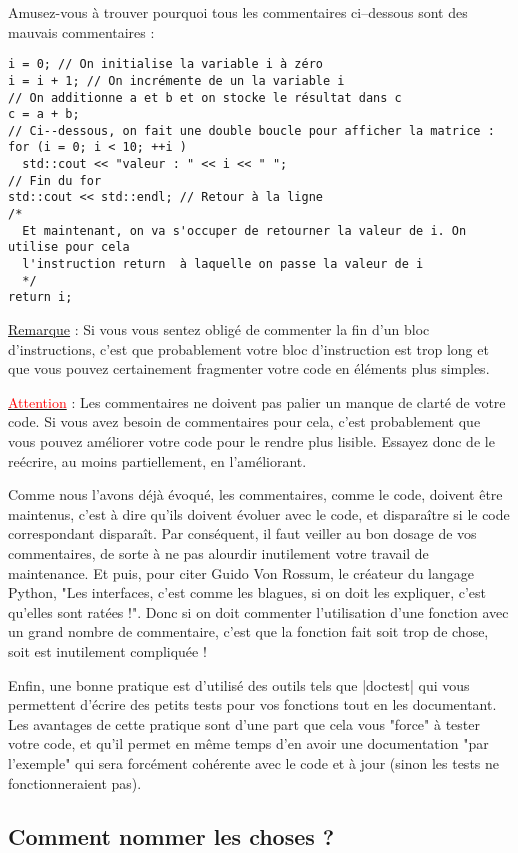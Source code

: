 Amusez-vous à trouver pourquoi tous les commentaires ci--dessous sont des mauvais commentaires :
\begin{lstlisting}
i = 0; // On initialise la variable i à zéro
i = i + 1; // On incrémente de un la variable i
// On additionne a et b et on stocke le résultat dans c
c = a + b;
// Ci--dessous, on fait une double boucle pour afficher la matrice :
for (i = 0; i < 10; ++i )
  std::cout << "valeur : " << i << " ";
// Fin du for
std::cout << std::endl; // Retour à la ligne
/*
  Et maintenant, on va s'occuper de retourner la valeur de i. On utilise pour cela
  l'instruction return  à laquelle on passe la valeur de i
  */
return i;
\end{lstlisting}

\underline{Remarque} : Si vous vous sentez obligé de commenter la fin d'un bloc d'instructions, c'est que
probablement votre bloc d'instruction est trop long et que vous pouvez certainement fragmenter votre code
en éléments plus simples.

\underline{\textcolor{red}{Attention}} : Les commentaires ne doivent pas palier un manque de clarté de votre code. Si
vous avez besoin de commentaires pour cela, c'est probablement que vous pouvez améliorer votre code pour le rendre plus
lisible. Essayez donc de le reécrire, au moins partiellement, en l'améliorant.

Comme nous l'avons déjà évoqué, les commentaires, comme le code, doivent être maintenus, c'est à dire qu'ils doivent
évoluer avec le code, et disparaître si le code correspondant disparaît. Par conséquent, il faut veiller au bon dosage
de vos commentaires, de sorte à ne pas alourdir inutilement votre travail de maintenance. Et puis, pour citer
Guido Von Rossum, le créateur du langage Python, "Les interfaces, c'est comme les blagues, si on doit les expliquer, c'est qu'elles sont ratées !". Donc si on doit commenter l'utilisation d'une fonction avec un grand nombre de commentaire, c'est
que la fonction fait soit trop de chose, soit est inutilement compliquée !

Enfin, une bonne pratique est d'utilisé des outils tels que |doctest| qui vous permettent d'écrire des petits tests pour vos fonctions tout en les documentant. Les avantages de cette pratique sont d'une part que cela vous "force" à tester votre code,
et qu'il permet en même temps d'en avoir une documentation "par l'exemple" qui sera forcément cohérente avec le code et à jour
(sinon les tests ne fonctionneraient pas). 

\subsection{Comment nommer les choses ?}

